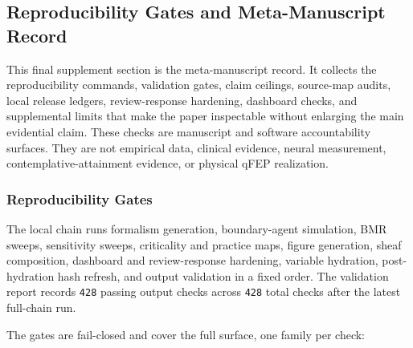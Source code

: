 \documentclass[
]{article}
\begin{document}
\subsection{Reproducibility Gates and Meta-Manuscript
Record}\label{sec:supplement-meta-manuscript-record}

This final supplement section is the meta-manuscript record. It collects
the reproducibility commands, validation gates, claim ceilings,
source-map audits, local release ledgers, review-response hardening,
dashboard checks, and supplemental limits that make the paper
inspectable without enlarging the main evidential claim. These checks
are manuscript and software accountability surfaces. They are not
empirical data, clinical evidence, neural measurement,
contemplative-attainment evidence, or physical qFEP realization.

\subsubsection{Reproducibility
Gates}\label{sec:supplement-reproducibility-gates}

The local chain runs formalism generation, boundary-agent simulation,
BMR sweeps, sensitivity sweeps, criticality and practice maps, figure
generation, sheaf composition, dashboard and review-response hardening,
variable hydration, post-hydration hash refresh, and output validation
in a fixed order. The validation report records \texttt{428} passing
output checks across \texttt{428} total checks after the latest
full-chain run.

The gates are fail-closed and cover the full surface, one family per
check:
\end{document}
